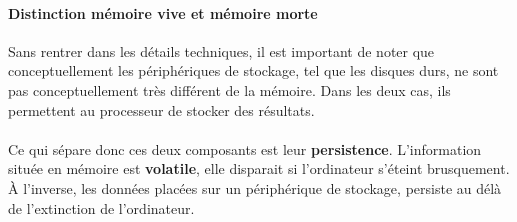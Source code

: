 {  \paragraph{Distinction mémoire vive et mémoire morte} Sans rentrer dans les détails techniques, il
  est important de noter que conceptuellement les périphériques de stockage, tel que les disques durs,
  ne sont pas conceptuellement très différent de la mémoire. Dans les deux cas, ils permettent au
  processeur de stocker des résultats.

  \paragraph{} Ce qui sépare donc ces deux composants est leur \textbf{persistence}. L'information
  située en mémoire est \textbf{volatile}, elle disparait si l'ordinateur s'éteint brusquement. À
  l'inverse, les données placées sur un périphérique de stockage, persiste au délà de l'extinction de
  l'ordinateur.
}



